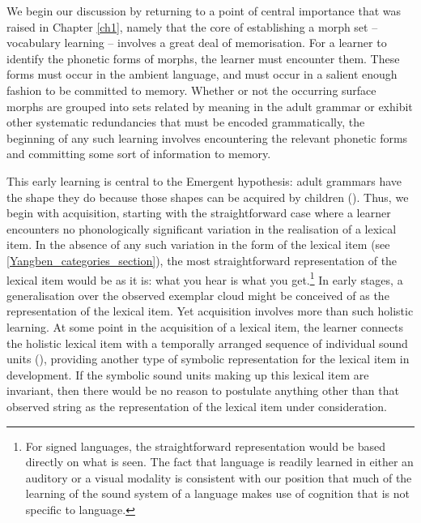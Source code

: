 We begin our discussion by returning to a point of central importance that was raised in Chapter \ref{ch1}, namely that  the core of establishing a morph set -- vocabulary learning -- involves a great deal of memorisation. For a learner to identify the phonetic forms of morphs, the learner must encounter them. These forms must occur in the ambient language, and must occur in a salient enough fashion to be committed to memory. Whether or not the occurring surface morphs are grouped into sets related by meaning in the adult grammar or exhibit other systematic redundancies that must be encoded grammatically, the beginning of any such learning involves encountering the relevant phonetic forms and committing some sort of information to memory.


This early learning is central to the Emergent hypothesis: adult grammars have the shape they do because those shapes can be acquired by children (\citealt{Deacon:1997}). Thus, we begin with acquisition, starting with the straightforward case where a learner encounters no phonologically significant variation in the realisation of a lexical item.  In the absence of any such variation in the form of the lexical item (see \textsection\ref{Yangben_categories_section}), the most straightforward representation of the lexical item would be as it is: what you  hear is what you get.\footnote{For signed languages, the straightforward representation would be based directly on what is seen. The fact that language is readily learned in either an auditory or a visual modality is consistent with our position that much of the learning of the sound system of a language makes use of cognition that is not specific to language.} In early stages, a generalisation over the observed exemplar cloud might be conceived of as the representation of the lexical item.  Yet acquisition involves more than such holistic learning. At some point in the acquisition of a lexical item, the learner connects the holistic lexical item with a temporally arranged sequence of  individual sound units (\citealt{Bybee:1999}), providing another type of symbolic representation for the lexical item in development.  If the symbolic sound units making up this lexical item are invariant, then there would be no reason to postulate anything other than that observed string as the representation of the lexical item under consideration.


